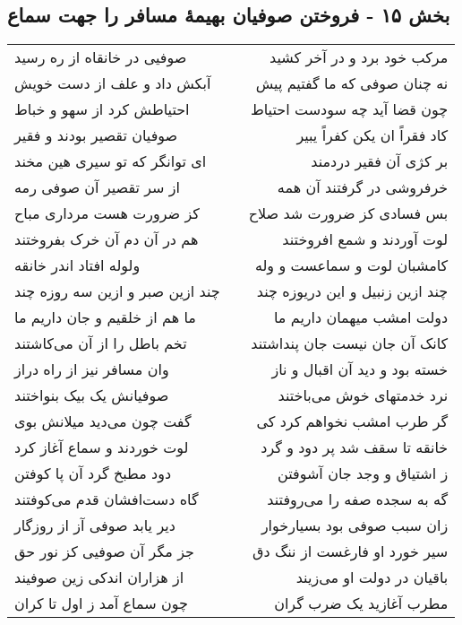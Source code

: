 \begin{center}
\section*{بخش ۱۵ - فروختن صوفیان بهیمهٔ مسافر را جهت سماع}
\label{sec:sh015}
\begin{longtable}{l p{0.5cm} r}
صوفیی در خانقاه از ره رسید
&&
مرکب خود برد و در آخر کشید
\\
آبکش داد و علف از دست خویش
&&
نه چنان صوفی که ما گفتیم پیش
\\
احتیاطش کرد از سهو و خباط
&&
چون قضا آید چه سودست احتیاط
\\
صوفیان تقصیر بودند و فقیر
&&
کاد فقراً ان یکن کفراً یبیر
\\
ای توانگر که تو سیری هین مخند
&&
بر کژی آن فقیر دردمند
\\
از سر تقصیر آن صوفی رمه
&&
خرفروشی در گرفتند آن همه
\\
کز ضرورت هست مرداری مباح
&&
بس فسادی کز ضرورت شد صلاح
\\
هم در آن دم آن خرک بفروختند
&&
لوت آوردند و شمع افروختند
\\
ولوله افتاد اندر خانقه
&&
کامشبان لوت و سماعست و وله
\\
چند ازین صبر و ازین سه روزه چند
&&
چند ازین زنبیل و این دریوزه چند
\\
ما هم از خلقیم و جان داریم ما
&&
دولت امشب میهمان داریم ما
\\
تخم باطل را از آن می‌کاشتند
&&
کانک آن جان نیست جان پنداشتند
\\
وان مسافر نیز از راه دراز
&&
خسته بود و دید آن اقبال و ناز
\\
صوفیانش یک بیک بنواختند
&&
نرد خدمتهای خوش می‌باختند
\\
گفت چون می‌دید میلانش بوی
&&
گر طرب امشب نخواهم کرد کی
\\
لوت خوردند و سماع آغاز کرد
&&
خانقه تا سقف شد پر دود و گرد
\\
دود مطبخ گرد آن پا کوفتن
&&
ز اشتیاق و وجد جان آشوفتن
\\
گاه دست‌افشان قدم می‌کوفتند
&&
گه به سجده صفه را می‌روفتند
\\
دیر یابد صوفی آز از روزگار
&&
زان سبب صوفی بود بسیارخوار
\\
جز مگر آن صوفیی کز نور حق
&&
سیر خورد او فارغست از ننگ دق
\\
از هزاران اندکی زین صوفیند
&&
باقیان در دولت او می‌زیند
\\
چون سماع آمد ز اول تا کران
&&
مطرب آغازید یک ضرب گران
\\

\end{longtable}
\end{center}
